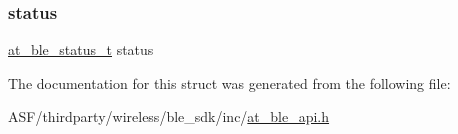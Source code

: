 \subsubsection{\texorpdfstring{status}{status}}
{\footnotesize\ttfamily \mbox{\hyperlink{group__error__codes__group_ga3b1db9b95feb157b3c188ca27fe76988}{at\+\_\+ble\+\_\+status\+\_\+t}} status}



The documentation for this struct was generated from the following file\+:\begin{DoxyCompactItemize}
\item 
A\+S\+F/thirdparty/wireless/ble\+\_\+sdk/inc/\mbox{\hyperlink{at__ble__api_8h}{at\+\_\+ble\+\_\+api.\+h}}\end{DoxyCompactItemize}
